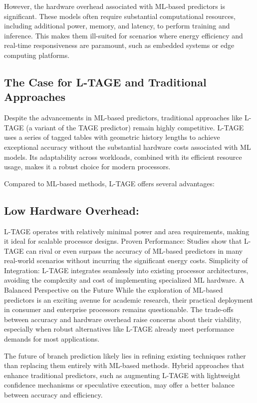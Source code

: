 \documentclass[10pt,journal,compsoc]{IEEEtran}
\begin{document}
However, the hardware overhead associated with ML-based predictors is significant. These models often require substantial computational resources, including additional power, memory, and latency, to perform training and inference. This makes them ill-suited for scenarios where energy efficiency and real-time responsiveness are paramount, such as embedded systems or edge computing platforms.

\subsection*{The Case for L-TAGE and Traditional Approaches}
Despite the advancements in ML-based predictors, traditional approaches like L-TAGE (a variant of the TAGE predictor) remain highly competitive. L-TAGE uses a series of tagged tables with geometric history lengths to achieve exceptional accuracy without the substantial hardware costs associated with ML models. Its adaptability across workloads, combined with its efficient resource usage, makes it a robust choice for modern processors.

Compared to ML-based methods, L-TAGE offers several advantages:

\subsection*{Low Hardware Overhead:} L-TAGE operates with relatively minimal power and area requirements, making it ideal for scalable processor designs.
Proven Performance: Studies show that L-TAGE can rival or even surpass the accuracy of ML-based predictors in many real-world scenarios without incurring the significant energy costs.
Simplicity of Integration: L-TAGE integrates seamlessly into existing processor architectures, avoiding the complexity and cost of implementing specialized ML hardware.
A Balanced Perspective on the Future
While the exploration of ML-based predictors is an exciting avenue for academic research, their practical deployment in consumer and enterprise processors remains questionable. The trade-offs between accuracy and hardware overhead raise concerns about their viability, especially when robust alternatives like L-TAGE already meet performance demands for most applications.

The future of branch prediction likely lies in refining existing techniques rather than replacing them entirely with ML-based methods. Hybrid approaches that enhance traditional predictors, such as augmenting L-TAGE with lightweight confidence mechanisms or speculative execution, may offer a better balance between accuracy and efficiency.
\end{document}
